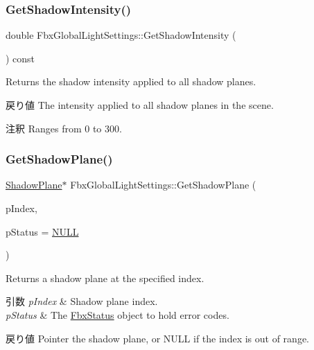 \subsubsection{\texorpdfstring{Get\+Shadow\+Intensity()}{GetShadowIntensity()}}
{\footnotesize\ttfamily double Fbx\+Global\+Light\+Settings\+::\+Get\+Shadow\+Intensity (\begin{DoxyParamCaption}{ }\end{DoxyParamCaption}) const}

Returns the shadow intensity applied to all shadow planes. \begin{DoxyReturn}{戻り値}
The intensity applied to all shadow planes in the scene. 
\end{DoxyReturn}
\begin{DoxyRemark}{注釈}
Ranges from 0 to 300. 
\end{DoxyRemark}
\mbox{\label{class_fbx_global_light_settings_aa4eb1de6e7b85273bb761b4dfc782d1d}} 
\subsubsection{\texorpdfstring{Get\+Shadow\+Plane()}{GetShadowPlane()}}
{\footnotesize\ttfamily \hyperlink{struct_fbx_global_light_settings_1_1_shadow_plane}{Shadow\+Plane}$\ast$ Fbx\+Global\+Light\+Settings\+::\+Get\+Shadow\+Plane (\begin{DoxyParamCaption}\item[{int}]{p\+Index,  }\item[{\hyperlink{class_fbx_status}{Fbx\+Status} $\ast$}]{p\+Status = {\ttfamily \hyperlink{fbxarch_8h_a070d2ce7b6bb7e5c05602aa8c308d0c4}{N\+U\+LL}} }\end{DoxyParamCaption})}

Returns a shadow plane at the specified index. 
\begin{DoxyParams}{引数}
{\em p\+Index} & Shadow plane index. \\
\hline
{\em p\+Status} & The \hyperlink{class_fbx_status}{Fbx\+Status} object to hold error codes. \\
\hline
\end{DoxyParams}
\begin{DoxyReturn}{戻り値}
Pointer the shadow plane, or {\ttfamily N\+U\+LL} if the index is out of range. 
\end{DoxyReturn}
\mbox{\label{class_fbx_global_light_settings_ac859310b4945161a224a512b1de5288d}} 
